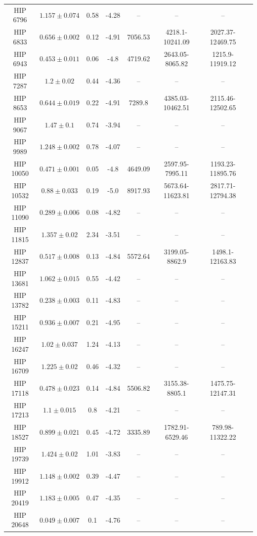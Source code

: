 \begin{longtable}{|c|c|c|c|c|c|c|c|}
HIP 6796 & $ 1.157 \pm 0.074 $ & 0.58 & -4.28 &-- &-- &-- \\
HIP 6833 & $ 0.656 \pm 0.002 $ & 0.12 & -4.91 & 7056.53 & 4218.1-10241.09 & 2027.37-12469.75 \\
HIP 6943 & $ 0.453 \pm 0.011 $ & 0.06 & -4.8 & 4719.62 & 2643.05-8065.82 & 1215.9-11919.12 \\
HIP 7287 & $ 1.2 \pm 0.02 $ & 0.44 & -4.36 &-- &-- &-- \\
HIP 8653 & $ 0.644 \pm 0.019 $ & 0.22 & -4.91 & 7289.8 & 4385.03-10462.51 & 2115.46-12502.65 \\
HIP 9067 & $ 1.47 \pm 0.1 $ & 0.74 & -3.94 &-- &-- &-- \\
HIP 9989 & $ 1.248 \pm 0.002 $ & 0.78 & -4.07 &-- &-- &-- \\
HIP 10050 & $ 0.471 \pm 0.001 $ & 0.05 & -4.8 & 4649.09 & 2597.95-7995.11 & 1193.23-11895.76 \\
HIP 10532 & $ 0.88 \pm 0.033 $ & 0.19 & -5.0 & 8917.93 & 5673.64-11623.81 & 2817.71-12794.38 \\
HIP 11090 & $ 0.289 \pm 0.006 $ & 0.08 & -4.82 &-- &-- &-- \\
HIP 11815 & $ 1.357 \pm 0.02 $ & 2.34 & -3.51 &-- &-- &-- \\
HIP 12837 & $ 0.517 \pm 0.008 $ & 0.13 & -4.84 & 5572.64 & 3199.05-8862.9 & 1498.1-12163.83 \\
HIP 13681 & $ 1.062 \pm 0.015 $ & 0.55 & -4.42 &-- &-- &-- \\
HIP 13782 & $ 0.238 \pm 0.003 $ & 0.11 & -4.83 &-- &-- &-- \\
HIP 15211 & $ 0.936 \pm 0.007 $ & 0.21 & -4.95 &-- &-- &-- \\
HIP 16247 & $ 1.02 \pm 0.037 $ & 1.24 & -4.13 &-- &-- &-- \\
HIP 16709 & $ 1.225 \pm 0.02 $ & 0.46 & -4.32 &-- &-- &-- \\
HIP 17118 & $ 0.478 \pm 0.023 $ & 0.14 & -4.84 & 5506.82 & 3155.38-8805.1 & 1475.75-12147.31 \\
HIP 17213 & $ 1.1 \pm 0.015 $ & 0.8 & -4.21 &-- &-- &-- \\
HIP 18527 & $ 0.899 \pm 0.021 $ & 0.45 & -4.72 & 3335.89 & 1782.91-6529.46 & 789.98-11322.22 \\
HIP 19739 & $ 1.424 \pm 0.02 $ & 1.01 & -3.83 &-- &-- &-- \\
HIP 19912 & $ 1.148 \pm 0.002 $ & 0.39 & -4.47 &-- &-- &-- \\
HIP 20419 & $ 1.183 \pm 0.005 $ & 0.47 & -4.35 &-- &-- &-- \\
HIP 20648 & $ 0.049 \pm 0.007 $ & 0.1 & -4.76 &-- &-- &-- \\

\end{longtable}
